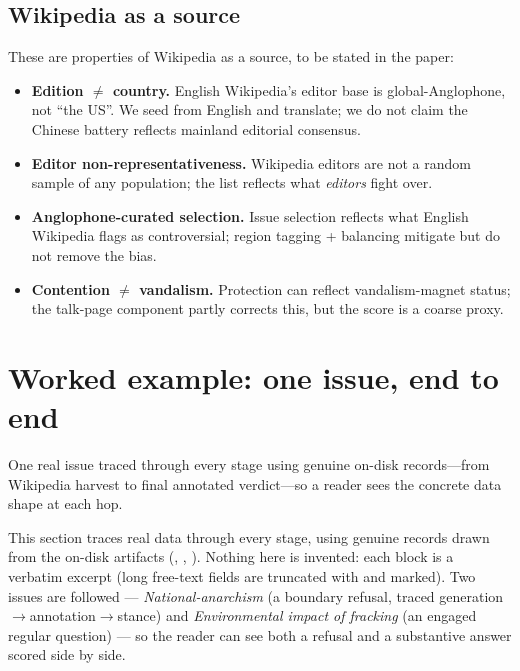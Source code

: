 \documentclass[11pt]{article}
\DeclareRobustCommand{\file}[1]{\texttt{\seqsplit{#1}}}
\DeclareRobustCommand{\code}[1]{\texttt{\seqsplit{#1}}}
\begin{document}
\subsection{Wikipedia as a source}

These are properties of Wikipedia as a source, to be stated in the paper:
\begin{itemize}[nosep]
  \item \textbf{Edition $\ne$ country.} English Wikipedia's editor base is
        global-Anglophone, not ``the US''. We seed from English and translate; we
        do not claim the Chinese battery reflects mainland editorial consensus.
  \item \textbf{Editor non-representativeness.} Wikipedia editors are not a random
        sample of any population; the list reflects what \emph{editors} fight over.
  \item \textbf{Anglophone-curated selection.} Issue selection reflects what
        English Wikipedia flags as controversial; region tagging + balancing
        mitigate but do not remove the bias.
  \item \textbf{Contention $\ne$ vandalism.} Protection can reflect vandalism-magnet
        status; the talk-page component partly corrects this, but the score is a
        coarse proxy.
\end{itemize}

\section{Worked example: one issue, end to end}
\label{sec:worked}

\begin{summarybox}
One real issue traced through every stage using genuine on-disk records---from Wikipedia harvest to final annotated verdict---so a reader sees the concrete data shape at each hop.
\end{summarybox}

This section traces real data through every stage, using genuine records drawn
from the on-disk artifacts (\file{data/}, \file{prompts/},
\file{annotations/pilot\_v1/}). Nothing here is invented: each block is a
verbatim excerpt (long free-text fields are truncated with \code{[...]} and
marked). Two issues are followed --- \emph{National-anarchism} (a boundary
refusal, traced generation$\to$annotation$\to$stance) and \emph{Environmental
impact of fracking} (an engaged regular question) --- so the reader can see both
a refusal and a substantive answer scored side by side.
\end{document}
